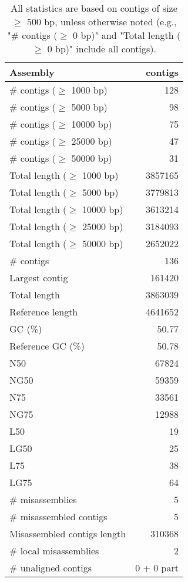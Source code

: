 \documentclass[12pt,a4paper]{article}
\begin{document}
\begin{table}[ht]
\begin{center}
\caption{All statistics are based on contigs of size $\geq$ 500 bp, unless otherwise noted (e.g., "\# contigs ($\geq$ 0 bp)" and "Total length ($\geq$ 0 bp)" include all contigs).}
\begin{tabular}{|l*{1}{|r}|}
\hline
Assembly & contigs \\ \hline
\# contigs ($\geq$ 1000 bp) & 128 \\ \hline
\# contigs ($\geq$ 5000 bp) & 98 \\ \hline
\# contigs ($\geq$ 10000 bp) & 75 \\ \hline
\# contigs ($\geq$ 25000 bp) & 47 \\ \hline
\# contigs ($\geq$ 50000 bp) & 31 \\ \hline
Total length ($\geq$ 1000 bp) & 3857165 \\ \hline
Total length ($\geq$ 5000 bp) & 3779813 \\ \hline
Total length ($\geq$ 10000 bp) & 3613214 \\ \hline
Total length ($\geq$ 25000 bp) & 3184093 \\ \hline
Total length ($\geq$ 50000 bp) & 2652022 \\ \hline
\# contigs & 136 \\ \hline
Largest contig & 161420 \\ \hline
Total length & 3863039 \\ \hline
Reference length & 4641652 \\ \hline
GC (\%) & 50.77 \\ \hline
Reference GC (\%) & 50.78 \\ \hline
N50 & 67824 \\ \hline
NG50 & 59359 \\ \hline
N75 & 33561 \\ \hline
NG75 & 12988 \\ \hline
L50 & 19 \\ \hline
LG50 & 25 \\ \hline
L75 & 38 \\ \hline
LG75 & 64 \\ \hline
\# misassemblies & 5 \\ \hline
\# misassembled contigs & 5 \\ \hline
Misassembled contigs length & 310368 \\ \hline
\# local misassemblies & 2 \\ \hline
\# unaligned contigs & 0 + 0 part \\ \hline

\end{tabular}
\end{center}
\end{table}
\end{document}
